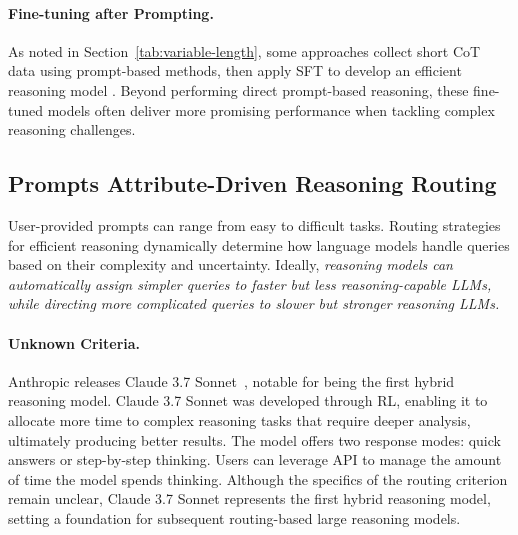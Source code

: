 \paragraph{Fine-tuning after Prompting.}
As noted in Section~\ref{tab:variable-length}, some approaches collect short CoT data using prompt-based methods, then apply SFT to develop an efficient reasoning model \cite{han2024token}. Beyond performing direct prompt-based reasoning, these fine-tuned models often deliver more promising performance when tackling complex reasoning challenges.

\subsection{Prompts Attribute-Driven Reasoning Routing}
\label{sec:routing}

User-provided prompts can range from easy to difficult tasks. Routing strategies for efficient reasoning dynamically determine how language models handle queries based on their complexity and uncertainty. Ideally, \textit{reasoning models can automatically assign simpler queries to faster but less reasoning-capable LLMs, while directing more complicated queries to slower but stronger reasoning LLMs.}


\paragraph{Unknown Criteria.} Anthropic releases Claude 3.7 Sonnet~\cite{anthropic_claude_sonnet}, notable for being the first hybrid reasoning model. Claude 3.7 Sonnet was developed through RL, enabling it to allocate more time to complex reasoning tasks that require deeper analysis, ultimately producing better results. The model offers two response modes: quick answers or step-by-step thinking. Users can leverage API to manage the amount of time the model spends thinking. Although the specifics of the routing criterion remain unclear, Claude 3.7 Sonnet represents the first hybrid reasoning model, setting a foundation for subsequent routing-based large reasoning models.

